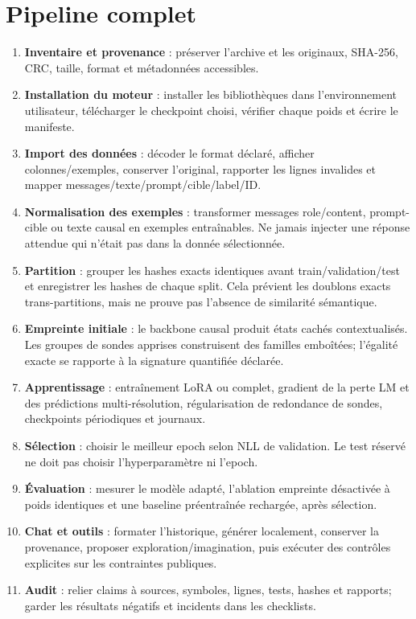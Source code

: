 \documentclass[11pt,a4paper]{article}
\begin{document}
\section{Pipeline complet}
\begin{enumerate}[leftmargin=*]
\item \textbf{Inventaire et provenance} : préserver l'archive et les originaux, SHA-256, CRC, taille, format et métadonnées accessibles.
\item \textbf{Installation du moteur} : installer les bibliothèques dans l'environnement utilisateur, télécharger le checkpoint choisi, vérifier chaque poids et écrire le manifeste.
\item \textbf{Import des données} : décoder le format déclaré, afficher colonnes/exemples, conserver l'original, rapporter les lignes invalides et mapper messages/texte/prompt/cible/label/ID.
\item \textbf{Normalisation des exemples} : transformer messages role/content, prompt-cible ou texte causal en exemples entraînables. Ne jamais injecter une réponse attendue qui n'était pas dans la donnée sélectionnée.
\item \textbf{Partition} : grouper les hashes exacts identiques avant train/validation/test et enregistrer les hashes de chaque split. Cela prévient les doublons exacts trans-partitions, mais ne prouve pas l'absence de similarité sémantique.
\item \textbf{Empreinte initiale} : le backbone causal produit états cachés contextualisés. Les groupes de sondes apprises construisent des familles emboîtées; l'égalité exacte se rapporte à la signature quantifiée déclarée.
\item \textbf{Apprentissage} : entraînement LoRA ou complet, gradient de la perte LM et des prédictions multi-résolution, régularisation de redondance de sondes, checkpoints périodiques et journaux.
\item \textbf{Sélection} : choisir le meilleur epoch selon NLL de validation. Le test réservé ne doit pas choisir l'hyperparamètre ni l'epoch.
\item \textbf{Évaluation} : mesurer le modèle adapté, l'ablation empreinte désactivée à poids identiques et une baseline préentraînée rechargée, après sélection.
\item \textbf{Chat et outils} : formater l'historique, générer localement, conserver la provenance, proposer exploration/imagination, puis exécuter des contrôles explicites sur les contraintes publiques.
\item \textbf{Audit} : relier claims à sources, symboles, lignes, tests, hashes et rapports; garder les résultats négatifs et incidents dans les checklists.
\end{enumerate}
\end{document}
